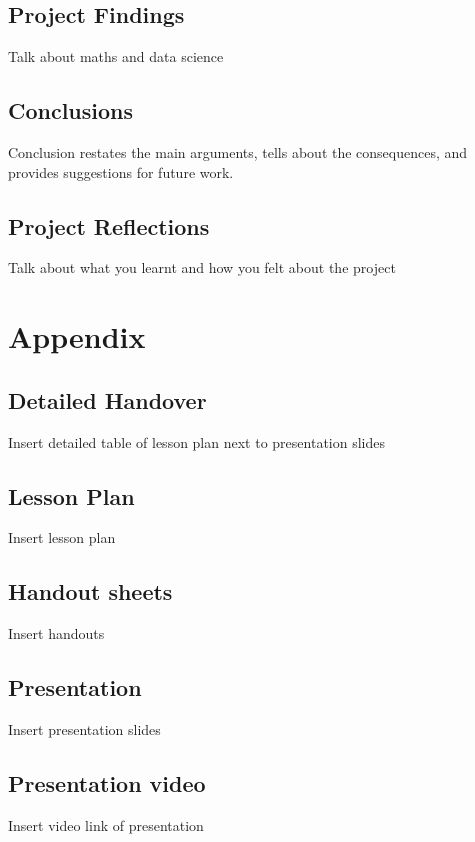 \documentclass[12pt, a4paper,oneside]{book}
\numberwithin{equation}{section}
\begin{document}
\section{Project Findings}
Talk about maths and data science

\section{Conclusions}
Conclusion restates the main arguments, tells about the consequences, and provides suggestions for future work.

\section{Project Reflections}
Talk about what you learnt and how you felt about the project

\chapter*{Appendix}
\appendix
{}

\section*{Detailed Handover}
Insert detailed table of lesson plan next to presentation slides

\section*{Lesson Plan}
Insert lesson plan

\section*{Handout sheets}\label{secx}
Insert handouts

\section*{Presentation}\label{secx.x}
Insert presentation slides

\section*{Presentation video}\label{secx.x}
Insert video link of presentation

\end{document}
